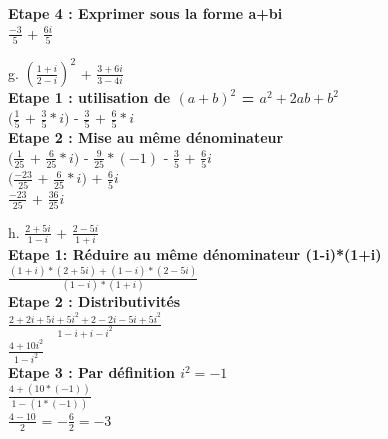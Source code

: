 \textbf{Etape 4 : Exprimer sous la forme a+bi} \\

$\frac{-3}{5}$ + $\frac{6i}{5}$ \\

\newpage

g. $(\frac{1+i}{2-i})^{2}$ + $\frac{3+6i}{3-4i}$ \\

\textbf{Etape 1 : utilisation de $(a+b)^{2}$ = $a^{2}+2ab+b^{2}$} \\

$(\frac{1}{5}$ + $\frac{3}{5}*i)$ - $\frac{3}{5}$ + $\frac{6}{5}*i$ \\

\textbf{Etape 2 : Mise au même dénominateur} \\

$(\frac{1}{25}$ + $\frac{6}{25}*i)$ - $\frac{9}{25}*(-1)$ - $\frac{3}{5}$ + $\frac{6}{5}i$ \\

$(\frac{-23}{25}$ + $\frac{6}{25}*i)$ + $\frac{6}{5}i$ \\

$\frac{-23}{25}$ + $\frac{36}{25}i$ \\

\vspace{5mm} %

h. $\frac{2+5i}{1-i}$ + $\frac{2-5i}{1+i}$ \\

\textbf{Etape 1: Réduire au même dénominateur (1-i)*(1+i)} \\

$\frac{(1+i) * (2+5i) + (1-i) * (2-5i)}{ (1-i) * (1+i) }$ \\

\textbf{Etape 2 : Distributivités} \\

$\frac{2+2i+5i+5i^{2} + 2-2i-5i+5i^{2} }{1-i+i-i^{2}}$ \\

$\frac{4 + 10i^{2} }{1-i^{2}}$ \\

\textbf{Etape 3 : Par définition $i^{2} = -1$} \\

$\frac{4 + (10*(-1)) }{1-(1*(-1))}$ \\

$\frac{4-10}{2}$ = $-\frac{6}{2} = -3$ \\

\vspace{5mm} %

